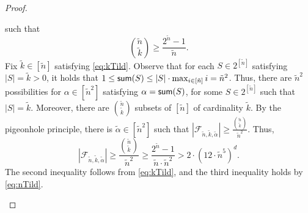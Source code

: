 \begin{proof}
\begin{claimproof}
				  such that 
				  \begin{equation}
				  	\label{eq:kTild}
				  	{\tilde{n} \choose \tilde{k}} \geq \frac{2^{\tilde{n}}-1}{\tilde{n}}.
				  \end{equation}
				   Fix $\tilde{k} \in \left[\tilde{n}\right]$ satisfying \eqref{eq:kTild}. Observe that for each $S \in 2^{[\tilde{n}]}$ satisfying $|S| = \tilde{k}>0$, it holds that $1 \leq \textnormal{\textsf{sum}}(S) \leq |S| \cdot \max_{i \in [\tilde{n}]} i = \tilde{n}^2$. Thus, there are $\tilde{n}^2$ possibilities for $\alpha \in \left[\tilde{n}^2\right]$ satisfying $\alpha = \textnormal{\textsf{sum}}(S)$, for some $S \in 2^{[\tilde{n}]}$ such that $|S| = \tilde{k}$. Moreover, there are ${\tilde{n} \choose \tilde{k}}$ subsets of $[\tilde{n}]$ of cardinality $\tilde{k}$. By the pigeonhole principle, there is $\tilde{\alpha} \in  \left[  \tilde{n}^2 \right]$ such that $|\mathcal{F}_{\tilde{n},\tilde{k},\tilde{\alpha}}| \geq  \frac{{\tilde{n} \choose \tilde{k}}}{\tilde{n}^2}$. Thus,
				   $$|\mathcal{F}_{\tilde{n},\tilde{k},\tilde{\alpha}}| \geq \frac{{\tilde{n} \choose \tilde{k}}}{\tilde{n}^2}  \geq  \frac{2^{\tilde{n}}-1}{\tilde{n} \cdot \tilde{n}^2} > 2 \cdot \left(	12 \cdot \tilde{n}^5 \right)^{d}.$$ The second inequality follows from \eqref{eq:kTild}, and the third inequality holds by \eqref{eq:nTild}. 
		\end{claimproof}
		
	


\end{proof}
